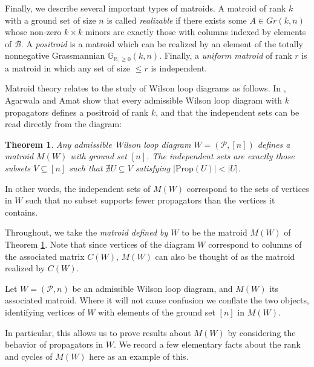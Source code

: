 \documentclass[11pt]{article}
\newcommand{\R}{\mathbb{R}}
\newcommand{\Gr}{\mathbb{G}_{\R, \geq 0}}
\newcommand{\cP}{\mathcal{P}}
\newcommand{\cB}{\mathcal{B}}
\newcommand{\Prop}{\textrm{Prop}}
\newtheorem{thm}{Theorem}[section]
\theoremstyle{remark}
\theoremstyle{definition}
\begin{document}
Finally, we describe several important types of matroids. A matroid of rank $k$ with a ground set of size $n$ is called {\em realizable} if there exists some $A \in Gr(k,n)$ whose non-zero $k\times k$ minors are exactly those with columns indexed by elements of $\cB$. A {\em positroid} is a matroid which can be realized by an element of the totally nonnegative Grassmannian $\Gr(k,n)$. Finally, a {\em uniform matroid} of rank $r$ is a matroid in which any set of size $\leq r$ is independent.


Matroid theory relates to the study of Wilson loop diagrams as follows. In \cite{wilsonloop}, Agarwala and Amat show that every admissible Wilson loop diagram with $k$ propagators defines a positroid of rank $k$, and that the independent sets can be read directly from the diagram:

\begin{thm} \label{thm WLD defines matroid} \cite[Theorem 3.6]{wilsonloop} Any admissible Wilson loop diagram $W =(\cP, [n])$ defines a matroid $M(W)$ with ground set $[n]$. The independent sets are exactly those subsets $V \subseteq [n]$ such that $\nexists U\subseteq V$ satisfying $|\Prop(U)| < |U|$. \label{thm:WLDmatroid}\end{thm}
In other words, the independent sets of $M(W)$ correspond to the sets of vertices in $W$ such that no subset supports fewer propagators than the vertices it contains.

Throughout, we take the {\em matroid defined by $W$} to be the matroid $M(W)$ of Theorem \ref{thm WLD defines matroid}. Note that since vertices of the diagram $W$ correspond to columns of the associated matrix $C(W)$, $M(W)$ can also be thought of as the matroid realized by $C(W)$. 




Let $W = (\cP,n)$ be an admissible Wilson loop diagram, and $M(W)$ its associated matroid. Where it will not cause confusion we conflate the two objects, identifying vertices of $W$ with elements of the ground set $[n]$ in $M(W)$. 

In particular, this allows us to prove results about $M(W)$ by considering the behavior of propagators in $W$. We record a few elementary facts about the rank and cycles of $M(W)$ here as an example of this.
\end{document}
